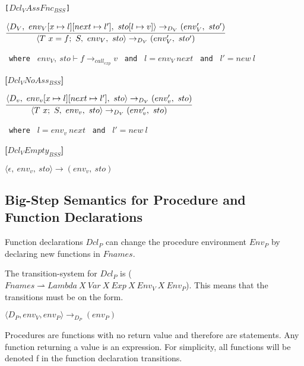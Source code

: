 {\texttt{[$Dcl_VAssFnc_{BSS}$]}\\
\begin{center}
	\begin{math}
		\cfrac
			{\langle D_V,\ env_V[x \mapsto l][next \mapsto l'],\ sto[l \mapsto v] \rangle \rightarrow_{D_V} (env_V',\ sto')}
			{\langle T\ x = f;\ S,\ env_V,\ sto \rangle \rightarrow_{D_V} (env_V',\ sto')}		
	\end{math}
	
	\texttt{ where } $env_V,\ sto \vdash f \rightarrow_{call_{exp}} v$
	\texttt{ and } $l = env_V\ next$
	\texttt{ and } $l' = new\ l$
\end{center}

\textbf{[$Dcl_VNoAss_{BSS}$]}\\
\begin{center}
	\begin{math}
	\cfrac
		{\langle D_v,\ env_v[x \mapsto l][next \mapsto l'],\ sto \rangle \rightarrow_{D_V} (env_v',\ sto)}
		{\langle T\ x;\ S,\ env_v,\ sto \rangle \rightarrow_{D_V} (env_v',\ sto)}
	\end{math}
	
	\texttt{ where } $l = env_v\ next$
	\texttt{ and } $l' = new\ l$
\end{center}

\textbf{[$Dcl_VEmpty_{BSS}$]}\\
\begin{center}
	\begin{math}
	\langle \epsilon,\ env_v,\ sto \rangle \rightarrow (env_v,\ sto)
	\end{math}
\end{center}

\subsection{Big-Step Semantics for Procedure and Function Declarations}
Function declarations $Dcl_P$ can change the procedure environment $Env_P$ by declaring new functions in $Fnames$.

The transition-system for $Dcl_P$ is ($Fnames \rightharpoonup Lambda\ X\ Var\ X\ Exp\ X\ Env_V\ X\ Env_P$).
This means that the transitions must be on the form.

\begin{center}
	$\langle D_P, env_V, env_P \rangle \rightarrow_{D_P} (env_P)$
\end{center}

Procedures are functions with no return value and therefore are statements.
Any function returning a value is an expression.
For simplicity, all functions will be denoted f in the function declaration transitions.

}
